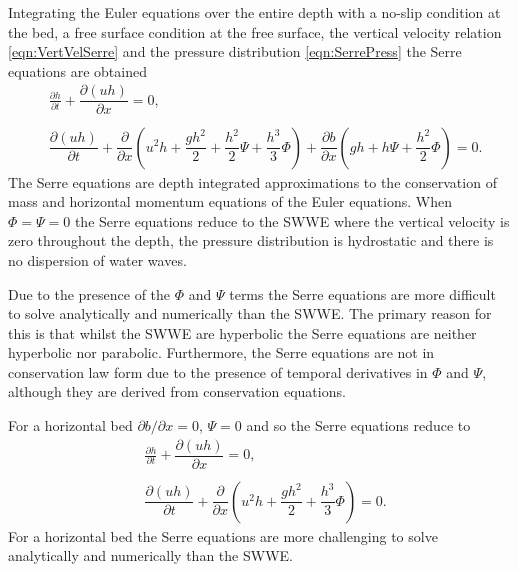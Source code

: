 Integrating the Euler equations \cite{Su-Gardener-1969-536,Zoppou-2014} over the entire depth with a no-slip condition at the bed, a free surface condition at the free surface, the vertical velocity relation \eqref{eqn:VertVelSerre} and the pressure distribution \eqref{eqn:SerrePress} the Serre equations are obtained
\begin{subequations}
	\begin{align}
	&\frac{\partial h}{\partial t} + \dfrac{\partial (uh)}{\partial x} = 0,  \label{eqn:FullSerreNonConMass} \\ \nonumber \\
	&\dfrac{\partial (uh)}{\partial t} + \dfrac{\partial}{\partial x} \left ( u^2h + \dfrac{gh^2}{2} + \dfrac{h^2}{2}{\Psi} + \dfrac{h^3}{3}{ \Phi }  \right )  +  \dfrac{\partial b}{\partial x} \left (gh +   h \Psi + \dfrac{h^2}{2}{ \Phi }  \right ) = 0.	\label{eqn:FullSerreNonConMome}
	\end{align}
	\label{eqn:FullSerreNonCon}
\end{subequations}
The Serre equations are depth integrated approximations to the conservation of mass and horizontal momentum equations of the Euler equations.
When $\Phi = \Psi = 0$ the Serre equations reduce to the SWWE where the vertical velocity is zero throughout the depth, the pressure distribution is hydrostatic and there is no dispersion of water waves. 

Due to the presence of the $\Phi$ and $\Psi$ terms the Serre equations are more difficult to solve analytically and numerically than the SWWE. The primary reason for this is that whilst the SWWE are hyperbolic the Serre equations are neither hyperbolic nor parabolic. Furthermore, the Serre equations are not in conservation law form due to the presence of temporal derivatives in $\Phi$ and $\Psi$, although they are derived from conservation equations. 

For a horizontal bed $\partial b / \partial x = 0$, $\Psi = 0$ and so the Serre equations reduce to
\begin{subequations}
	\label{eqn:FullSerreNonConHorizbed}
	\begin{align}
	\label{eqn:FullSerreNonConMassHorizbed}
	&\frac{\partial h}{\partial t} + \dfrac{\partial (uh)}{\partial x} = 0, \\ \nonumber \\
	\label{eqn:FullSerreNonConMomeHorizbed}
	&\dfrac{\partial (uh)}{\partial t} + \dfrac{\partial}{\partial x} \left ( u^2h + \dfrac{gh^2}{2} + \dfrac{h^3}{3}{ \Phi }  \right ) = 0.
	\end{align}
\end{subequations}	
For a horizontal bed the Serre equations are more challenging to solve analytically and numerically than the SWWE. 

